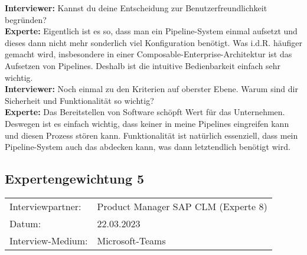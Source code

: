 \begin{linenumbers}
    \textbf{Interviewer:} Kannst du deine Entscheidung zur Benutzerfreundlichkeit begründen?\\
    \textbf{Experte:} Eigentlich ist es so, dass man ein Pipeline-System einmal aufsetzt und dieses dann nicht mehr sonderlich viel Konfiguration benötigt. Was i.d.R. häufiger gemacht wird, insbesondere in einer Composable-Enterprise-Architektur ist das Aufsetzen von Pipelines. Deshalb ist die intuitive Bedienbarkeit einfach sehr wichtig.\\
    \textbf{Interviewer:} Noch einmal zu den Kriterien auf oberster Ebene. Warum sind dir Sicherheit und Funktionalität so wichtig?\\
    \textbf{Experte:} Das Bereitstellen von Software schöpft Wert für das Unternehmen. Deswegen ist es einfach wichtig, dass keiner in meine Pipelines eingreifen kann und diesen Prozess stören kann. Funktionalität ist natürlich essenziell, dass mein Pipeline-System auch das abdecken kann, was dann letztendlich benötigt wird.\\
    
\end{linenumbers}


\newpage
\subsection{Expertengewichtung 5}
        \begin{tabular}{ l l }
    Interviewpartner: & Product Manager SAP CLM (Experte 8)\\
    Datum: & 22.03.2023\\
    Interview-Medium: & Microsoft-Teams\\
\end{tabular}
\begin{center}
\begin{figure}[H]
    \centering
    \label{fig:gew_51}
\end{figure}	
\end{center}
\begin{center}
\begin{figure}[H]
    \centering
    \label{fig:gew_52}
\end{figure}	
\end{center}

